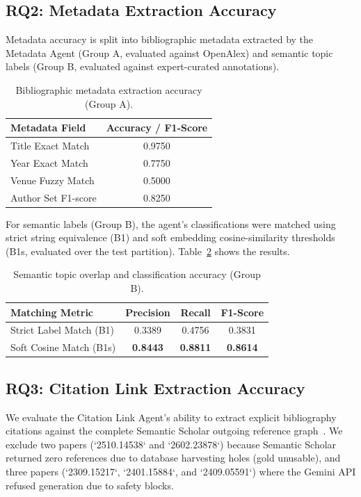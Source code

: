 \documentclass[runningheads]{llncs}
\begin{document}
\subsection{RQ2: Metadata Extraction Accuracy}
Metadata accuracy is split into bibliographic metadata extracted by the Metadata Agent (Group A, evaluated against OpenAlex) and semantic topic labels (Group B, evaluated against expert-curated annotations).

\begin{table}[h]
\centering
\caption{Bibliographic metadata extraction accuracy (Group A).}
\label{tab:rq2_group_a}
\begin{tabular}{lc}
\toprule
\textbf{Metadata Field} & \textbf{Accuracy / F1-Score} \\
\midrule
Title Exact Match & 0.9750 \\
Year Exact Match & 0.7750 \\
Venue Fuzzy Match & 0.5000 \\
Author Set F1-score & 0.8250 \\
\bottomrule
\end{tabular}
\end{table}

For semantic labels (Group B), the agent's classifications were matched using strict string equivalence (B1) and soft embedding cosine-similarity thresholds (B1s, evaluated over the test partition). Table~\ref{tab:rq2_group_b} shows the results.

\begin{table}[h]
\centering
\caption{Semantic topic overlap and classification accuracy (Group B).}
\label{tab:rq2_group_b}
\begin{tabular}{lccc}
\toprule
\textbf{Matching Metric} & \textbf{Precision} & \textbf{Recall} & \textbf{F1-Score} \\
\midrule
Strict Label Match (B1) & 0.3389 & 0.4756 & 0.3831 \\
Soft Cosine Match (B1s) & \textbf{0.8443} & \textbf{0.8811} & \textbf{0.8614} \\
\bottomrule
\end{tabular}
\end{table}

\subsection{RQ3: Citation Link Extraction Accuracy}
We evaluate the Citation Link Agent's ability to extract explicit bibliography citations against the complete Semantic Scholar outgoing reference graph~\cite{lo2020s2orc,kinney2023semantic}. We exclude two papers (`2510.14538` and `2602.23878`) because Semantic Scholar returned zero references due to database harvesting holes (gold unusable), and three papers (`2309.15217`, `2401.15884`, and `2409.05591`) where the Gemini API refused generation due to safety blocks.
\end{document}
